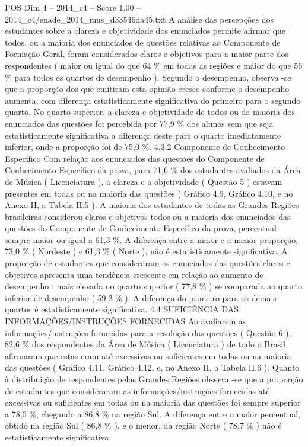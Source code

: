 \begin{textsample}{POS Dim 4 – 2014\_c4 – Score 1.00 – 2014\_c4/enade\_2014\_mus\_d33546da45.txt}
A análise das percepções dos estudantes sobre a clareza e objetividade dos enunciados permite afirmar que todos, ou a maioria dos enunciados de questões relativas ao Componente de Formação Geral, foram considerados claros e objetivos para a maior parte dos respondentes ( maior ou igual do que 64 \% em todas as regiões e maior do que 56 \% para todos os quartos de desempenho ).
Segundo o desempenho, observa -se que a proporção dos que emitiram esta opinião cresce conforme o desempenho aumenta, com diferença estatisticamente significativa do primeiro para o segundo quarto.
No quarto superior, a clareza e objetividade de todos ou da maioria dos enunciados das questões foi percebida por 77,9 \% dos alunos sem que seja estatisticamente significativa a diferença deste para o quarto imediatamente inferior, onde a proporção foi de 75,0 \%. 4.3.2 Componente de Conhecimento Específico Com relação aos enunciados das questões do Componente de Conhecimento Específico da prova, para 71,6 \% dos estudantes avaliados da Área de Música ( Licenciatura ), a clareza e a objetividade ( Questão 5 ) estavam presentes em todas ou na maioria das questões ( Gráfico 4.9, Gráfico 4.10, e no Anexo II, a Tabela II.5 ).
A maioria dos estudantes de todas as Grandes Regiões brasileiras considerou claros e objetivos todos ou a maioria dos enunciados das questões do Componente de Conhecimento Específico da prova, percentual sempre maior ou igual a 61,3 \%.
A diferença entre a maior e a menor proporção, 73,0 \% ( Nordeste ) e 61,3 \% ( Norte ), não é estatisticamente significativa.
A proporção de estudantes que consideraram os enunciados das questões claros e objetivos apresenta uma tendência crescente em relação ao aumento de desempenho : mais elevada no quarto superior ( 77,8 \% ) se comparada ao quarto inferior de desempenho ( 59,2 \% ).
A diferença do primeiro para os demais quartos é estatisticamente significativa. 4.4 SUFICIÊNCIA DAS INFORMAÇÕES/INSTRUÇÕES FORNECIDAS Ao avaliarem as informações/instruções fornecidas para a resolução das questões ( Questão 6 ), 82,6 \% dos respondentes da Área de Música ( Licenciatura ) de todo o Brasil afirmaram que estas eram até excessivas ou suficientes em todas ou na maioria das questões ( Gráfico 4.11, Gráfico 4.12, e, no Anexo II, a Tabela II.6 ).
Quanto à distribuição de respondentes pelas Grandes Regiões observa -se que a proporção de estudantes que consideraram as informações/instruções fornecidas até excessivas ou suficientes em todas ou na maioria das questões foi sempre superior a 78,0 \%, chegando a 86,8 \% na região Sul.
A diferença entre o maior percentual, obtido na região Sul ( 86,8 \% ), e o menor, da região Norte ( 78,7 \% ) não é estatisticamente significativa.

\end{textsample}
